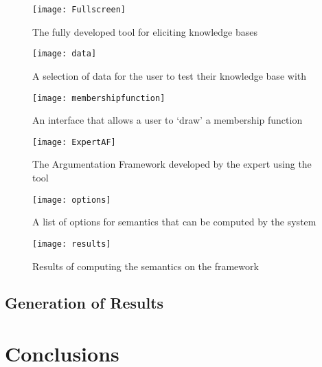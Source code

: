 \begin{figure}[H]
\centering
\texttt{[image: Fullscreen]}
\caption{The fully developed tool for eliciting knowledge bases}
\end{figure}

\begin{figure}[H]
\centering
\texttt{[image: data]}
\caption{A selection of data for the user to test their knowledge base with}
\end{figure}

\begin{figure}[H]
\centering
\texttt{[image: membershipfunction]}
\caption{An interface that allows a user to `draw' a membership function}
\end{figure}

\begin{figure}[H]
\centering
\texttt{[image: ExpertAF]}
\caption{The Argumentation Framework developed by the expert using the tool}
\end{figure}

\begin{figure}[H]
\centering
\texttt{[image: options]}
\caption{A list of options for semantics that can be computed by the system}
\end{figure}

\begin{figure}[H]
\centering
\texttt{[image: results]}
\caption{Results of computing the semantics on the framework}
\end{figure}


\subsection{Generation of Results}



\section{Conclusions}


